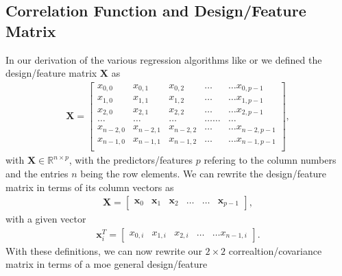 \documentclass[letterpaper,10pt,english]{sphinxmanual}
\begin{document}
\subsection{Correlation Function and Design/Feature Matrix}
\label{\detokenize{chapter4:correlation-function-and-design-feature-matrix}}
In our derivation of the various regression algorithms like  or 
we defined the design/feature matrix \(\boldsymbol{X}\) as
\begin{equation*}
\begin{split}
\boldsymbol{X}=\begin{bmatrix}
x_{0,0} & x_{0,1} & x_{0,2}& \dots & \dots x_{0,p-1}\\
x_{1,0} & x_{1,1} & x_{1,2}& \dots & \dots x_{1,p-1}\\
x_{2,0} & x_{2,1} & x_{2,2}& \dots & \dots x_{2,p-1}\\
\dots & \dots & \dots & \dots \dots & \dots \\
x_{n-2,0} & x_{n-2,1} & x_{n-2,2}& \dots & \dots x_{n-2,p-1}\\
x_{n-1,0} & x_{n-1,1} & x_{n-1,2}& \dots & \dots x_{n-1,p-1}\\
\end{bmatrix},
\end{split}
\end{equation*}
with \(\boldsymbol{X}\in {\mathbb{R}}^{n\times p}\), with the predictors/features \(p\)  refering to the column numbers and the
entries \(n\) being the row elements.
We can rewrite the design/feature matrix in terms of its column vectors as
\begin{equation*}
\begin{split}
\boldsymbol{X}=\begin{bmatrix} \boldsymbol{x}_0 & \boldsymbol{x}_1 & \boldsymbol{x}_2 & \dots & \dots & \boldsymbol{x}_{p-1}\end{bmatrix},
\end{split}
\end{equation*}
with a given vector
\begin{equation*}
\begin{split}
\boldsymbol{x}_i^T = \begin{bmatrix}x_{0,i} & x_{1,i} & x_{2,i}& \dots & \dots x_{n-1,i}\end{bmatrix}.
\end{split}
\end{equation*}
With these definitions, we can now rewrite our \(2\times 2\)
correaltion/covariance matrix in terms of a moe general design/feature
\end{document}

